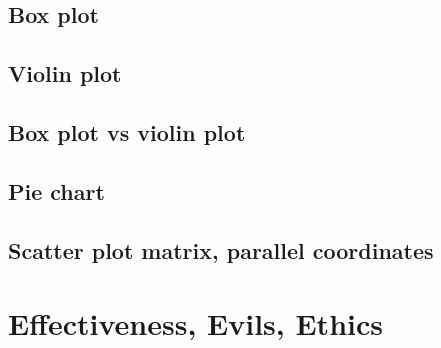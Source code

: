 \subsection{Box plot}
\begin{definition}
    \begin{itemize}

    \end{itemize}
\end{definition}

\subsection{Violin plot}

\subsection{Box plot vs violin plot}

\subsection{Pie chart}

\subsection{Scatter plot matrix, parallel coordinates}

\section{Effectiveness, Evils, Ethics}
